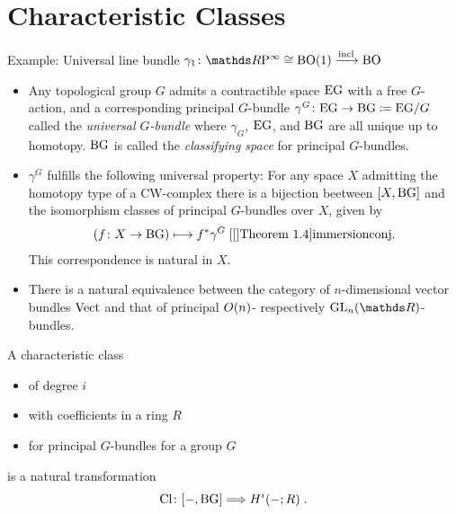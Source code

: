 \section{Characteristic Classes}
\begin{Def} %
  Example: Universal line bundle $\gamma_1\colon \RP\cong\BO(1)\xrightarrow{\incl} \BO$
\end{Def}

\begin{Def} 
  \begin{itemize}
  \item Any topological group $G$ admits a contractible space $\mathrm{E}\mathrm{G}$ with a
    free $G$-action, and a corresponding principal $G$-bundle
    $\gamma^G\colon \mathrm{E}\mathrm{G}\to\mathrm{BG}\coloneqq \mathrm{E}\mathrm{G}/G$ called the
    \emph{universal $G$-bundle}
    where $\gamma_G$, $\mathrm{E}\mathrm{G}$, and $\mathrm{BG}$ are all unique up to
    homotopy. %
    $\mathrm{BG}$ is called the \emph{classifying space} for principal
    $G$-bundles.
  \item $\gamma^G$ fulfills the following universal property:
    For any space $X$ admitting the homotopy type of a CW-complex
    there is a bijection beetween $[X,\mathrm{BG}]$ and the isomorphism classes of
    principal $G$-bundles over $X$, given by
    \begin{gather*}
      \left(f\colon X\to\BG \right) \longmapsto \pb f \gamma^G
      \;
      \text{\optcite[Theorem 1.4]{immersionconj}}.
    \end{gather*}
    This correspondence is natural in $X$.
  \item There is a natural equivalence between the category of
    $n$-dimensional vector bundles $\mathrm{Vect}$ and that of principal
    $O(n)$- respectively $\GL n$-bundles.
  \end{itemize}
\end{Def}

\begin{Def}
  A characteristic class
  \begin{itemize}
  \item of degree $i$
  \item with coefficients in a ring $R$
  \item for principal $G$-bundles for a group $G$
  \end{itemize}
  is a natural transformation
  \begin{gather*}
    \mathrm{Cl}\colon [-, \mathrm{BG}] \Longrightarrow H^i(-; R)\;.
  \end{gather*}
\end{Def}

